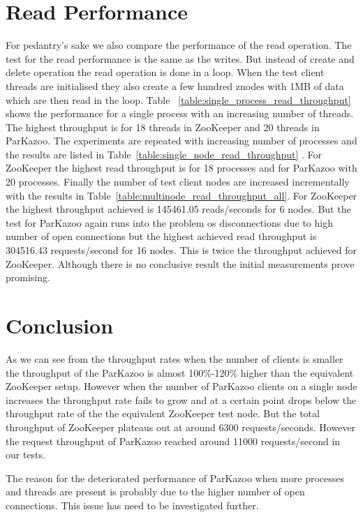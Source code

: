 \section{Read Performance}
For pedantry's sake we also compare the performance of the read operation. The test for the read performance is the same as the writes. But instead of create and delete operation the read operation is done in a loop. When the test client threads are initialised they also create a few hundred znodes with 1MB of data which are then read in the loop. Table ~\ref{table:single_process_read_throughput} shows the performance for a single process with an increasing number of threads. The highest throughput is for 18 threads in ZooKeeper and 20 threads in ParKazoo. The experiments are repeated with increasing number of processes and the results are listed in Table~\ref{table:single_node_read_throughput} . For ZooKeeper the highest read throughput is for 18 processes and for ParKazoo with 20 processes. Finally the number of test client nodes are increased incrementally with the results in Table~\ref{table:multinode_read_throughput_all}. For ZooKeeper the highest throughput achieved is 145461.05 reads/seconds for 6 nodes. But the test for ParKazoo again runs into the problem os disconnections due to high number of open connections but the highest achieved read throughput is 304516.43 requests/second for 16 nodes. This is twice the throughput achieved for ZooKeeper. Although there is no conclusive result the initial measurements prove promising.




\section{Conclusion}
As we can see from the throughput rates when the number of clients is smaller the throughput of the ParKazoo is almost 100\%-120\% higher than the equivalent ZooKeeper setup. However when the number of ParKazoo clients on a single node increases the throughput rate fails to grow and at a certain point drops below the throughput rate of the the equivalent ZooKeeper test node. But the total throughput of ZooKeeper plateaus out at around 6300 requests/seconds. However the request throughput of ParKazoo reached around 11000 requests/second in our tests.

The reason for the deteriorated performance of ParKazoo when more processes and threads are present is probably due to the higher number of open connections. This issue has need to be investigated further. 
